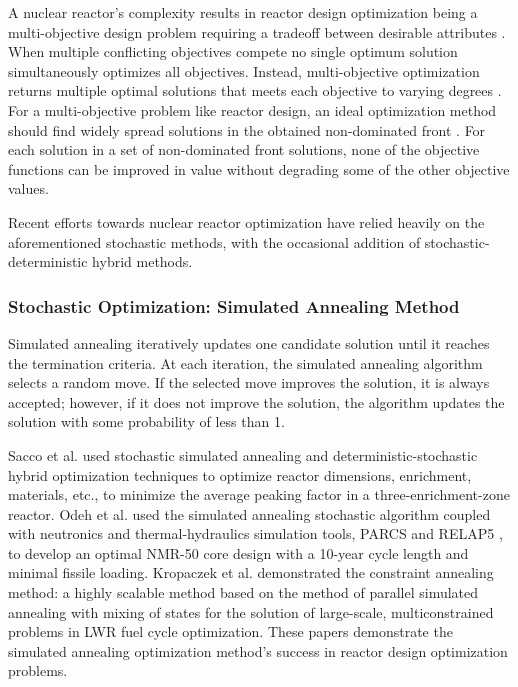 A nuclear reactor's complexity results in reactor design optimization being a 
multi-objective design problem requiring a tradeoff between desirable 
attributes \cite{byrne_evolving_2014,simon_sciences_2019}. 
When multiple conflicting objectives compete no single optimum solution 
simultaneously optimizes all objectives. 
Instead, multi-objective optimization returns multiple optimal 
solutions that meets each objective to varying degrees \cite{deb_multi-objective_2001}. 
For a multi-objective problem like reactor design, an ideal optimization method 
should find widely spread solutions in the obtained non-dominated front 
\cite{deb_multi-objective_2001}. 
For each solution in a set of non-dominated front solutions, none of 
the objective functions can be improved in value without degrading some of the 
other objective values. 

Recent efforts towards nuclear reactor optimization have relied heavily on 
the aforementioned stochastic methods, with the occasional addition of 
stochastic-deterministic hybrid methods.

\subsubsection{Stochastic Optimization: Simulated Annealing Method}
Simulated annealing iteratively updates one candidate solution until it reaches 
the termination criteria. 
At each iteration, the simulated annealing algorithm selects a random move. 
If the selected move improves the solution, it is always accepted; however,  
if it does not improve the solution, the algorithm updates the solution with 
some probability of less than 1.

Sacco et al. \cite{sacco_two_2006,sacco_metropolis_2008} used stochastic 
simulated annealing and deterministic-stochastic hybrid optimization techniques 
to optimize reactor dimensions, enrichment, materials, etc., to 
minimize the average peaking factor in a three-enrichment-zone reactor. 
Odeh et al. \cite{odeh_core_2016} used the simulated annealing stochastic algorithm 
coupled with neutronics and thermal-hydraulics simulation tools, \gls{PARCS} and RELAP5
\cite{fletcher_relap5mod3_1992}, to develop an optimal \gls{NMR-50} core design 
with a 10-year cycle length and minimal fissile loading. 
Kropaczek et al. \cite{kropaczek_large-scale_2019} demonstrated the constraint 
annealing method: a highly scalable method based on the method of parallel 
simulated annealing with mixing of states \cite{kropaczek_constraint_2019} for 
the solution of large-scale, multiconstrained problems in \gls{LWR} fuel cycle 
optimization. 
These papers demonstrate the simulated annealing optimization method's success in 
reactor design optimization problems. 


